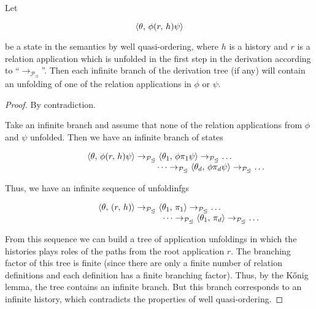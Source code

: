 \begin{lemma}
  \label{lem:one-step-liveness}
  Let

  \[
  \langle \theta,\, \phi (r,\, h) \psi \rangle
  \]

  be a state in the semantics by well quasi-ordering, where $h$ is a history and $r$ is a relation application which
  is unfolded in the first step in the derivation according to  ``$\rightarrow_{\mathcal{P}_\trianglelefteq}$''. Then each infinite branch
  of the derivation tree (if any) will contain an unfolding of one of the relation applications in $\phi$ or $\psi$.
\end{lemma}
\begin{proof}
By contradiction.

Take an infinite branch and assume that none of the relation applications from $\phi$ and $\psi$ unfolded.
Then we have an infinite branch of states

     \[
     \begin{array}{c}
     \langle \theta,\, \phi (r,\, h) \psi \rangle \rightarrow_{\mathcal{P}_\trianglelefteq} \langle \theta_1,\, \phi \pi_1 \psi \rangle \rightarrow_{\mathcal{P}_\trianglelefteq} \dots \\
     \phantom{XXXXXXXXXXXXX}\dots\rightarrow_{\mathcal{P}_\trianglelefteq} \langle \theta_d,\, \phi \pi_d \psi \rangle \rightarrow_{\mathcal{P}_\trianglelefteq} \dots
     \end{array}
     \]      

Thus, we have an infinite sequence of unfoldinfgs

\[
\begin{array}{c}
\langle \theta,\,(r,\,h) \rangle\to_{\mathcal{P}_\trianglelefteq}\langle \theta_1,\,\pi_1 \rangle\to_{\mathcal{P}_\trianglelefteq}\dots\\
\phantom{XXXXXXXXXXXXX}\dots\to_{\mathcal{P}_\trianglelefteq}\langle \theta_1,\,\pi_d \rangle\to_{\mathcal{P}_\trianglelefteq}\dots
\end{array}
\]

From this sequence we can build a tree of application unfoldings in which the histories plays roles of
the paths from the root application $r$. The branching factor of this tree is finite (since there are only a finite number of
relation definitions and each definition has a finite branching factor). Thus, by the K\H{o}nig lemma, the tree contains
an infinite branch. But this branch corresponds to an infinite history, which contradicts the properties of well
quasi-ordering. 
\end{proof}


